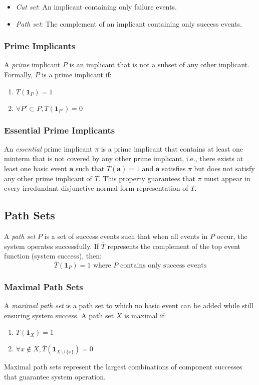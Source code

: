 \begin{itemize}
  \item \emph{Cut set}: An implicant containing only failure events.
  \item \emph{Path set}: The complement of an implicant containing only success events.
\end{itemize}

\subsubsection{Prime Implicants}
A \emph{prime} implicant $P$ is an implicant that is not a subset of any other implicant. Formally, $P$ is a prime implicant if:
\begin{enumerate}
  \item $T(\mathbf{1}_P) = 1$
  \item $\forall P' \subset P, T(\mathbf{1}_{P'}) = 0$
\end{enumerate}

\subsubsection{Essential Prime Implicants}
An \emph{essential} prime implicant $\pi$ is a prime implicant that contains at least one minterm that is not covered by any other prime implicant, i.e., there exists at least one basic event $\mathbf{a}$ such that $T(\mathbf{a}) = 1$ and $\mathbf{a}$ satisfies $\pi$ but does not satisfy any other prime implicant of $T$. This property guarantees that $\pi$ must appear in every irredundant disjunctive normal form representation of $T$.

\subsection{Path Sets}
A \emph{path set} $P$ is a set of success events such that when all events in $P$ occur, the system operates successfully. If $\overline{T}$ represents the complement of the top event function (system success), then:
\[
\overline{T}(\mathbf{1}_P) = 1 \text{ where } P \text{ contains only success events}
\]

\subsubsection{Maximal Path Sets}
A \emph{maximal path set} is a path set to which no basic event can be added while still ensuring system success. A path set $X$ is maximal if:
\begin{enumerate}
  \item $\overline{T}(\mathbf{1}_X) = 1$
  \item $\forall x \notin X, \overline{T}(\mathbf{1}_{X \cup \{x\}}) = 0$
\end{enumerate}
Maximal path sets represent the largest combinations of component successes that guarantee system operation.


